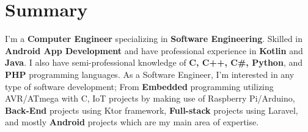 

\textcolor{darkgray}{\noindent\makebox[\linewidth]{\rule{\maxdimen}{2pt}}}

\section*{\LARGE{Summary}}
I'm a \textbf{Computer Engineer} specializing in \textbf{Software Engineering}.
Skilled in \textbf{Android App Development} and have professional experience in \textbf{Kotlin} and \textbf{Java}.
I also have semi-professional knowledge of \textbf{C, C++, C\#, Python}, and \textbf{PHP} programming languages.
As a Software Engineer, I'm interested in any type of software development;
From \textbf{Embedded} programming utilizing AVR/ATmega with C, \textbf{}IoT projects by making use of Raspberry Pi/Arduino,
\textbf{Back-End} projects using Ktor framework, \textbf{Full-stack} projects using Laravel, and mostly \textbf{Android} projects which are my main area of expertise.\\
\textcolor{darkgray}{\noindent\makebox[\linewidth]{\rule{\maxdimen}{2pt}}}

\begin{multicols}{2}
    

    
\end{multicols}
\textcolor{darkgray}{\noindent\makebox[\linewidth]{\rule{\maxdimen}{2pt}}}




